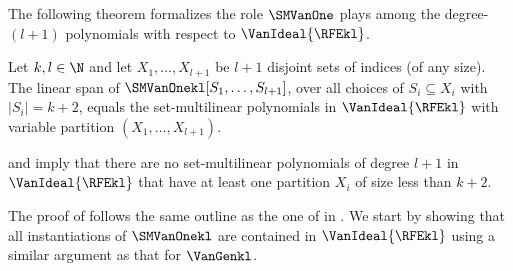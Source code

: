 The following theorem formalizes the role \(\SMVanOne\) plays among the degree-\((l+1)\) polynomials with respect to \(\VanIdeal{\RFEkl}\).
\begin{theorem}
  \label{thm.smvan1}
  Let \(k,l \in \N\)
  and let \(X_1, \ldots, X_{l+1}\) be \(l+1\) disjoint sets of
  indices (of any size).
  The linear span of $\SMVanOnekl[S_1,\dots,S_{l+1}]$, over all choices of
  $S_i\subseteq X_i$ with $|S_i|=k+2$, equals the set-multilinear 
  polynomials in $\VanIdeal{\RFEkl}$ with variable partition $(X_1, \dots, X_{l+1})$.
\end{theorem}
 and  imply  that there are no set-multilinear polynomials of degree $l+1$ in $\VanIdeal{\RFEkl}$ that have at least one partition $X_i$ of size less than $k+2$.

The proof of  follows the same outline as the one of  in . We start by showing that all instantiations of $\SMVanOnekl$ are contained in $\VanIdeal{\RFEkl}$ using a similar argument as that for $\VanGenkl$.

